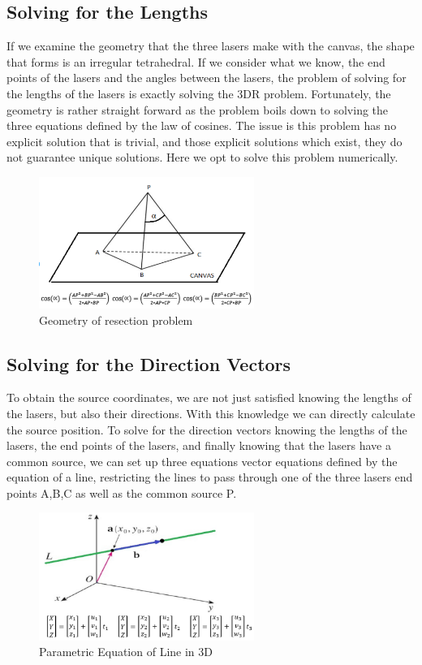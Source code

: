 \documentclass[a4paper]{article}
\begin{document}
\subsection{Solving for the Lengths}
If we examine the geometry that the three lasers make with the canvas, the shape that forms is an irregular tetrahedral. If we consider what we know, the end points of the lasers and the angles between the lasers, the problem of solving for the lengths of the lasers is exactly solving the 3DR problem. Fortunately, the geometry is rather straight forward as the problem boils down to solving the three equations defined by the law of cosines. The issue is this problem has no explicit solution that is trivial, and those explicit solutions which exist, they do not guarantee unique solutions. Here we opt to solve this problem numerically. 
\begin{figure}
\includegraphics[width=7cm]{resection_fig.png}
\caption{Geometry of resection problem}
\end{figure}

\subsection{Solving for the Direction Vectors}
To obtain the source coordinates, we are not just satisfied knowing the lengths of the lasers, but also their directions. With this knowledge we can directly calculate the source position. To solve for the direction vectors knowing the lengths of the lasers, the end points of the lasers, and finally knowing that the lasers have a common source, we can set up three equations vector equations defined by the equation of a line, restricting the lines to pass through one of the three lasers end points A,B,C as well as the common source P. 

\begin{figure}
	\includegraphics[width=7cm]{resection_fig2.png}
	\caption{Parametric Equation of Line in 3D}
\end{figure}
\end{document}

